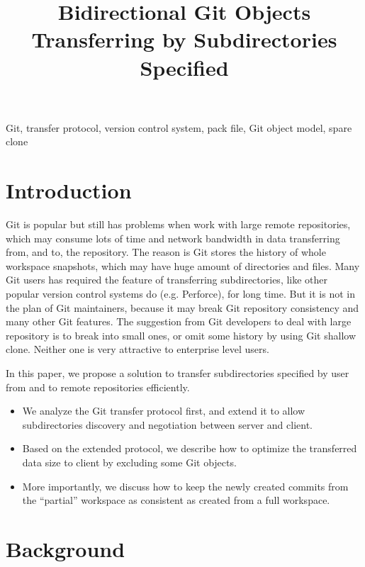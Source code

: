 \documentclass[preprint]{sigplanconf}
\begin{document}
\title{Bidirectional Git Objects Transferring by Subdirectories Specified}
\maketitle
\abstract{
    
}

\keywords
Git, transfer protocol, version control system, pack file, Git object model,
spare clone

\section{Introduction}
Git is popular but still has problems when work with large remote repositories,
which may consume lots of time and network bandwidth in data transferring from,
and to, the repository.
The reason is Git stores the history of whole workspace snapshots, which may
have huge amount of directories and files.
Many Git users has required the feature of transferring subdirectories, like
other popular version control systems do (e.g. Perforce), for long time.
But it is not in the plan of Git maintainers, because it may break Git
repository consistency and many other Git features\cite{roadmap}.
The suggestion from Git developers to deal with large repository is to break
into small ones, or omit some history by using Git shallow clone.
Neither one is very attractive to enterprise level users.

In this paper, we propose a solution to transfer subdirectories specified by
user from and to remote repositories efficiently.

\begin{itemize}
  \item We analyze the Git transfer protocol first, and extend it to allow
      subdirectories discovery and negotiation between server and client.

  \item Based on the extended protocol, we describe how to optimize the
      transferred data size to client by excluding some Git objects.

  \item More importantly, we discuss how to keep the newly created commits from
      the ``partial'' workspace as consistent as created from a full workspace.
\end{itemize}

\section{Background}
\end{document}
